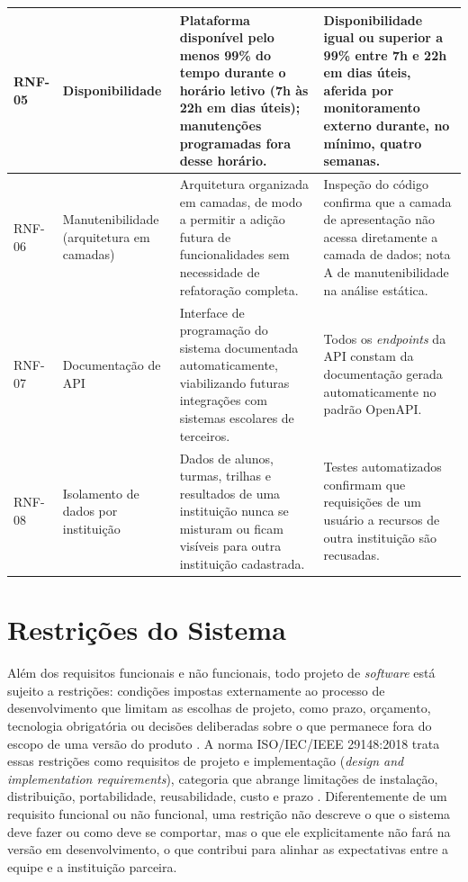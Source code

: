 {\begin{xltabular}{\textwidth}{|>{\centering\arraybackslash}p{1.4cm}|>{\raggedright\arraybackslash}p{2.8cm}|>{\raggedright\arraybackslash}X|>{\raggedright\arraybackslash}X|}
\hline
RNF-05 & Disponibilidade & Plataforma disponível pelo menos 99\% do tempo durante o horário letivo (7h às 22h em dias úteis); manutenções programadas fora desse horário. & Disponibilidade igual ou superior a 99\% entre 7h e 22h em dias úteis, aferida por monitoramento externo durante, no mínimo, quatro semanas. \\
\hline
RNF-06 & Manutenibilidade (arquitetura em camadas) & Arquitetura organizada em camadas, de modo a permitir a adição futura de funcionalidades sem necessidade de refatoração completa. & Inspeção do código confirma que a camada de apresentação não acessa diretamente a camada de dados; nota A de manutenibilidade na análise estática. \\
\hline
RNF-07 & Documentação de API & Interface de programação do sistema documentada automaticamente, viabilizando futuras integrações com sistemas escolares de terceiros. & Todos os \textit{endpoints} da API constam da documentação gerada automaticamente no padrão OpenAPI. \\
\hline
RNF-08 & Isolamento de dados por instituição & Dados de alunos, turmas, trilhas e resultados de uma instituição nunca se misturam ou ficam visíveis para outra instituição cadastrada. & Testes automatizados confirmam que requisições de um usuário a recursos de outra instituição são recusadas. \\
\hline
\end{xltabular}
}

\section{Restrições do Sistema}\label{sec:restricoes}

Além dos requisitos funcionais e não funcionais, todo projeto de \textit{software} está sujeito a restrições: condições impostas externamente ao processo de desenvolvimento que limitam as escolhas de projeto, como prazo, orçamento, tecnologia obrigatória ou decisões deliberadas sobre o que permanece fora do escopo de uma versão do produto \cite{pressman2021}. A norma ISO/IEC/IEEE 29148:2018 trata essas restrições como requisitos de projeto e implementação (\textit{design and implementation requirements}), categoria que abrange limitações de instalação, distribuição, portabilidade, reusabilidade, custo e prazo \cite{iso29148-2018}. Diferentemente de um requisito funcional ou não funcional, uma restrição não descreve o que o sistema deve fazer ou como deve se comportar, mas o que ele explicitamente não fará na versão em desenvolvimento, o que contribui para alinhar as expectativas entre a equipe e a instituição parceira.

